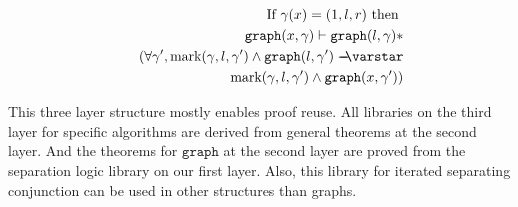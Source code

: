 \begin{eqnarray*}
&& \text{If } \gamma(x) = (1, l, r) \text{ then } \\
&& \mathtt{graph}(x, \gamma) \vdash \mathtt{graph}(l, \gamma) * \\
&& ~~ (\forall \gamma', \text{mark}(\gamma, l, \gamma') \wedge \mathtt{graph}(l, \gamma') \wand \\
&& ~~~~~~~~~~~~~~~~ \text{mark}(\gamma, l, \gamma') \wedge \mathtt{graph}(x, \gamma'))
\end{eqnarray*}

This three layer structure mostly enables proof reuse. All libraries on the third layer for specific algorithms are derived from general theorems at the second layer. And the theorems for $\mathtt{graph}$ at the second layer are proved from the separation logic library on our first layer. Also, this library for iterated separating conjunction can be used in other structures than graphs.

%



